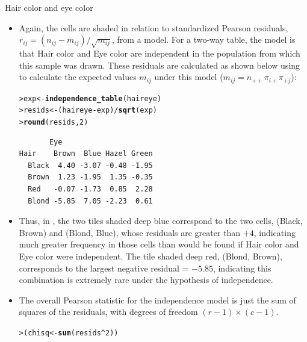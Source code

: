 \documentclass[10pt,krantz2]{krantz}\usepackage[]{graphicx}\usepackage[]{color}
\makeatletter
\newcommand{\hlnum}[1]{\textcolor[rgb]{0.686,0.059,0.569}{#1}}%
\newcommand{\hlopt}[1]{\textcolor[rgb]{0,0,0}{#1}}%
\newcommand{\hlstd}[1]{\textcolor[rgb]{0.345,0.345,0.345}{#1}}%
\newcommand{\hlkwb}[1]{\textcolor[rgb]{0.69,0.353,0.396}{#1}}%
\newcommand{\hlkwd}[1]{\textcolor[rgb]{0.737,0.353,0.396}{\textbf{#1}}}%
\newenvironment{kframe}{%
 \def\at@end@of@kframe{}%
 \ifinner\ifhmode%
  \def\at@end@of@kframe{\end{minipage}}%
  \begin{minipage}{\columnwidth}%
 \fi\fi%
 \def\FrameCommand##1{\hskip\@totalleftmargin \hskip-\fboxsep
 \colorbox{shadecolor}{##1}\hskip-\fboxsep
     \hskip-\linewidth \hskip-\@totalleftmargin \hskip\columnwidth}%
 \MakeFramed {\advance\hsize-\width
   \@totalleftmargin\z@ \linewidth\hsize
   \@setminipage}}%
 {\par\unskip\endMakeFramed%
 \at@end@of@kframe}
\newenvironment{knitrout}{}{} %
\renewenvironment{knitrout}{\small\renewcommand{\baselinestretch}{.85}}{} %
\makeatother
\begin{document}
\begin{Example}[haireye2a]{Hair color and eye color}
\begin{itemize}
\item Again, the cells are shaded in relation to standardized Pearson
residuals, \(r_{ij} = (n_{ij} - m_{ij}) / \sqrt { m_{ij} }\),
from a model.  For a two-way table, the model is that Hair color and
Eye color are independent in the population from which this sample
was drawn.  These residuals are calculated as shown below using
 to calculate the expected values $m_{ij}$ under this
model ($m_{ij} = n_{++} \pi_{i+} \pi_{+j}$):
\begin{knitrout}
\color{fgcolor}\begin{kframe}
\begin{alltt}
\hlstd{> }\hlstd{exp} \hlkwb{<-} \hlkwd{independence_table}\hlstd{(haireye)}
\hlstd{> }\hlstd{resids} \hlkwb{<-} \hlstd{(haireye} \hlopt{-} \hlstd{exp)} \hlopt{/} \hlkwd{sqrt}\hlstd{(exp)}
\hlstd{> }\hlkwd{round}\hlstd{(resids,} \hlnum{2}\hlstd{)}
\end{alltt}
\begin{verbatim}
       Eye
Hair    Brown  Blue Hazel Green
  Black  4.40 -3.07 -0.48 -1.95
  Brown  1.23 -1.95  1.35 -0.35
  Red   -0.07 -1.73  0.85  2.28
  Blond -5.85  7.05 -2.23  0.61
\end{verbatim}
\end{kframe}
\end{knitrout}
\item Thus, in ,
the two tiles shaded deep blue correspond to the two
cells, (Black, Brown) and (Blond, Blue), whose residuals are
greater than $+4$, indicating much greater frequency in those
cells than would be found if Hair color and Eye color were
independent.
The tile shaded deep red, (Blond, Brown),
corresponds to the largest negative residual = $-5.85$, indicating this combination
is extremely rare under the hypothesis of independence.
\item The overall Pearson \chisq{} statistic for the independence model
is just the
sum of squares of the residuals, with degrees of freedom $(r-1) \times (c-1)$.
\begin{knitrout}
\color{fgcolor}\begin{kframe}
\begin{alltt}
\hlstd{> }\hlstd{(chisq} \hlkwb{<-} \hlkwd{sum}\hlstd{(resids} \hlopt{^} \hlnum{2}\hlstd{))}
\end{alltt}
\begin{verbatim}

\end{verbatim}
\end{kframe}
\end{knitrout}
\end{itemize}
\end{Example}
\end{document}
